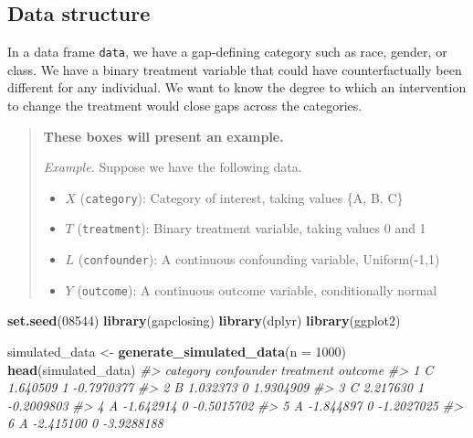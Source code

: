 \documentclass[
]{article}
\newenvironment{Shaded}{\begin{snugshade}}{\end{snugshade}}
\newcommand{\AttributeTok}[1]{\textcolor[rgb]{0.13,0.29,0.53}{#1}}
\newcommand{\CommentTok}[1]{\textcolor[rgb]{0.56,0.35,0.01}{\textit{#1}}}
\newcommand{\DecValTok}[1]{\textcolor[rgb]{0.00,0.00,0.81}{#1}}
\newcommand{\FunctionTok}[1]{\textcolor[rgb]{0.13,0.29,0.53}{\textbf{#1}}}
\newcommand{\NormalTok}[1]{#1}
\newcommand{\OtherTok}[1]{\textcolor[rgb]{0.56,0.35,0.01}{#1}}
\providecommand{\tightlist}{%
  \setlength{\itemsep}{0pt}\setlength{\parskip}{0pt}}
\begin{document}
\subsection{Data structure}\label{data-structure}

In a data frame \texttt{data}, we have a gap-defining category such as race, gender, or class. We have a binary treatment variable that could have counterfactually been different for any individual. We want to know the degree to which an intervention to change the treatment would close gaps across the categories.

\begin{quote}
\textbf{These boxes will present an example.}

\emph{Example.} Suppose we have the following data.

\begin{itemize}
\tightlist
\item
  \(X\) (\texttt{category}): Category of interest, taking values \{A, B, C\}
\item
  \(T\) (\texttt{treatment}): Binary treatment variable, taking values 0 and 1
\item
  \(L\) (\texttt{confounder}): A continuous confounding variable, Uniform(-1,1)
\item
  \(Y\) (\texttt{outcome}): A continuous outcome variable, conditionally normal
\end{itemize}
\end{quote}

\begin{Shaded}
\begin{Highlighting}[]
\FunctionTok{set.seed}\NormalTok{(}\DecValTok{08544}\NormalTok{)}
\FunctionTok{library}\NormalTok{(gapclosing)}
\FunctionTok{library}\NormalTok{(dplyr)}
\FunctionTok{library}\NormalTok{(ggplot2)}
\end{Highlighting}
\end{Shaded}

\begin{Shaded}
\begin{Highlighting}[]
\NormalTok{simulated\_data }\OtherTok{\textless{}{-}} \FunctionTok{generate\_simulated\_data}\NormalTok{(}\AttributeTok{n =} \DecValTok{1000}\NormalTok{)}
\FunctionTok{head}\NormalTok{(simulated\_data)}
\CommentTok{\#\textgreater{}   category confounder treatment    outcome}
\CommentTok{\#\textgreater{} 1        C   1.640509         1 {-}0.7970377}
\CommentTok{\#\textgreater{} 2        B   1.032373         0  1.9304909}
\CommentTok{\#\textgreater{} 3        C   2.217630         1 {-}0.2009803}
\CommentTok{\#\textgreater{} 4        A  {-}1.642914         0 {-}0.5015702}
\CommentTok{\#\textgreater{} 5        A  {-}1.844897         0 {-}1.2027025}
\CommentTok{\#\textgreater{} 6        A  {-}2.415100         0 {-}3.9288188}
\end{Highlighting}
\end{Shaded}
\end{document}
